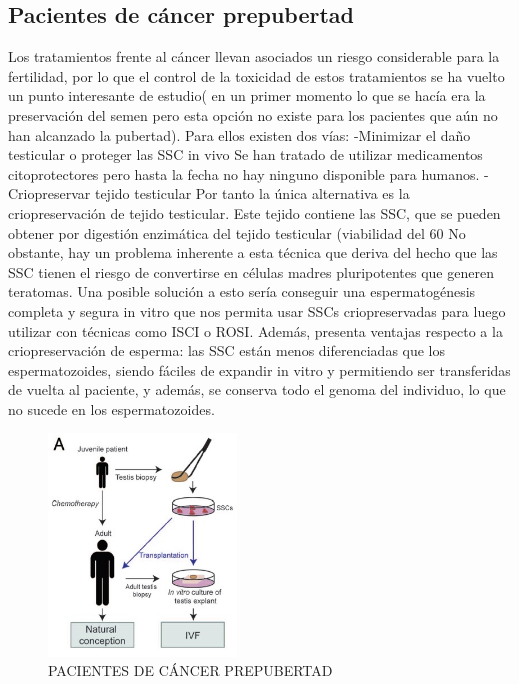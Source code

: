 \documentclass[a4paper,11pt]{article}
\begin{document}
\subsection{Pacientes de cáncer prepubertad}
Los tratamientos frente al cáncer llevan asociados un riesgo considerable para la fertilidad, por lo que el control de la toxicidad de estos tratamientos se ha vuelto un punto interesante de estudio( en un primer momento lo que se hacía era la preservación del semen pero esta opción no existe para los pacientes que aún no han alcanzado la pubertad). Para ellos existen dos vías:
-Minimizar el daño testicular o proteger las SSC in vivo
Se han tratado de utilizar medicamentos citoprotectores pero hasta la fecha no hay ninguno disponible para humanos.
-Criopreservar tejido testicular
Por tanto la única alternativa es la criopreservación de tejido testicular. Este tejido contiene las SSC, que se pueden obtener por digestión enzimática del tejido testicular (viabilidad del 60%
No obstante, hay un problema inherente a esta técnica que deriva del hecho que las SSC tienen el riesgo de convertirse en células madres pluripotentes que generen teratomas. Una posible solución a esto sería conseguir una espermatogénesis completa y segura in vitro que nos permita usar SSCs criopreservadas para luego utilizar con técnicas como ISCI o ROSI.  
Además, presenta ventajas respecto a la criopreservación de esperma: las SSC están menos diferenciadas que los espermatozoides, siendo fáciles de expandir in vitro y permitiendo ser transferidas de vuelta al paciente, y además, se conserva todo el genoma del individuo, lo que no sucede en los espermatozoides. 
\begin{figure}[htb!] 
    \caption{PACIENTES DE CÁNCER PREPUBERTAD}
    \centering 
    \includegraphics[width=5cm]{cancer-prepuber.jpg}
\end{figure}
\end{document}
